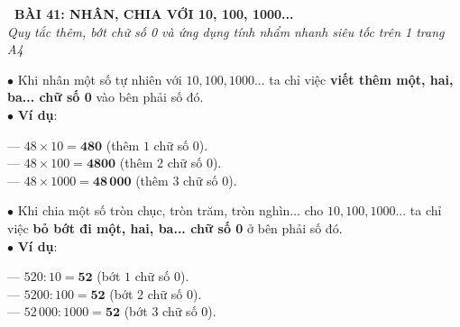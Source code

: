 \documentclass[14pt,a4paper,oneside]{extbook}
\begin{document}
\noindent
\begin{tcolorbox}[
  enhanced,
  colback=teal!8!white,
  colframe=teal!80!black,
  arc=3mm, boxrule=1pt,
  left=3mm, right=3mm, top=2mm, bottom=2mm,
  halign=center
]
  {\Large\bfseries\color{teal!90!black}\faBookmark\ BÀI 41: NHÂN, CHIA VỚI 10, 100, 1000...}\\[1.5pt]
  {\footnotesize\itshape\color{black!75} Quy tắc thêm, bớt chữ số 0 và ứng dụng tính nhẩm nhanh siêu tốc trên 1 trang A4}
\end{tcolorbox}

\vspace{2mm}

\noindent
\begin{minipage}[t]{0.49\textwidth}
  \begin{tcolorbox}[
    enhanced,
    title={\footnotesize\bfseries\color{white}\faPlusCircle\ 1. Nhân với 10, 100, 1000...},
    colback=blue!2!white,
    colframe=blue!75!black,
    arc=2.5mm, boxrule=0.8pt, top=1.8mm, bottom=1.8mm, left=2mm, right=2mm
  ]
    \footnotesize
    $\bullet$ Khi nhân một số tự nhiên với $10, 100, 1000...$ ta chỉ việc \textbf{viết thêm một, hai, ba... chữ số 0} vào bên phải số đó.\\
    $\bullet$ \textbf{Ví dụ}:
    \par
    --- $48 \times 10 = \mathbf{480}$ (thêm $1$ chữ số $0$).\\
    --- $48 \times 100 = \mathbf{4800}$ (thêm $2$ chữ số $0$).\\
    --- $48 \times 1000 = \mathbf{48\,000}$ (thêm $3$ chữ số $0$).
  \end{tcolorbox}
\end{minipage}%
\hfill
\begin{minipage}[t]{0.49\textwidth}
  \begin{tcolorbox}[
    enhanced,
    title={\footnotesize\bfseries\color{white}\faMinusCircle\ 2. Chia cho 10, 100, 1000...},
    colback=teal!2!white,
    colframe=teal!75!black,
    arc=2.5mm, boxrule=0.8pt, top=1.8mm, bottom=1.8mm, left=2mm, right=2mm
  ]
    \footnotesize
    $\bullet$ Khi chia một số tròn chục, tròn trăm, tròn nghìn... cho $10, 100, 1000...$ ta chỉ việc \textbf{bỏ bớt đi một, hai, ba... chữ số 0} ở bên phải số đó.\\
    $\bullet$ \textbf{Ví dụ}:
    \par
    --- $520 : 10 = \mathbf{52}$ (bớt $1$ chữ số $0$).\\
    --- $5200 : 100 = \mathbf{52}$ (bớt $2$ chữ số $0$).\\
    --- $52\,000 : 1000 = \mathbf{52}$ (bớt $3$ chữ số $0$).
  \end{tcolorbox}
\end{minipage}
\end{document}
